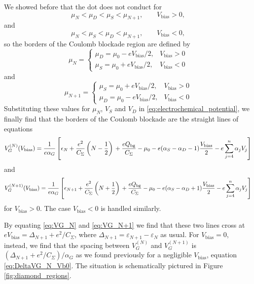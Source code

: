 We showed before that the dot does not conduct for
\begin{equation}
	 \mu_N < \mu_D < \mu_S < \mu_{N+1}, \qquad V_{\text{bias}} > 0,
\end{equation}
and
\begin{equation}
	 \mu_N < \mu_S < \mu_D < \mu_{N+1}, \qquad V_{\text{bias}} < 0,
\end{equation}
so the borders of the Coulomb blockade region are defined by
\begin{equation}
	\mu_N = 
	\begin{cases}
		\mu_D = \mu_0 - eV_{\text{bias}}/2, & V_{\text{bias}} > 0 \\
		\mu_S = \mu_0 + eV_{\text{bias}}/2, & V_{\text{bias}} < 0
	\end{cases}
\end{equation}
and
\begin{equation}
	\mu_{N+1} = 
	\begin{cases}
		\mu_S = \mu_0 + eV_{\text{bias}}/2, & V_{\text{bias}} > 0 \\
		\mu_D = \mu_0 - eV_{\text{bias}}/2, & V_{\text{bias}} < 0
	\end{cases}
\end{equation}
Substituting these values for $\mu_N$, $V_S$ and $V_D$ in \eqref{eq:electrochemical_potential}, we finally find that the borders of the Coulomb blockade are the straight lines of equations
\begin{dmath}
	V_G^{(N)}(V_{\text{bias}})
	= \frac{1}{e\alpha_G}\left[ \epsilon_N + \frac{e^2}{C_{\Sigma}}\left(N-\frac{1}{2}\right) \\
	+ \frac{eQ_{\text{bg}}}{C_{\Sigma}} - \mu_0 - e(\alpha_S-\alpha_D-1)\frac{V_{\text{bias}}}{2} - e\sum_{j=4}^{n}\alpha_jV_j \right]
	\label{eq:VG_N}
\end{dmath}
and
\begin{dmath}
	V_G^{(N+1)}(V_{\text{bias}})
	= \frac{1}{e\alpha_G}\left[ \epsilon_{N+1} + \frac{e^2}{C_{\Sigma}}\left(N+\frac{1}{2}\right) \\
	+ \frac{eQ_{\text{bg}}}{C_{\Sigma}} - \mu_0 - e(\alpha_S-\alpha_D+1)\frac{V_{\text{bias}}}{2} - e\sum_{j=4}^{n}\alpha_jV_j \right]
	\label{eq:VG_N+1}
\end{dmath}
for $V_{\text{bias}}>0$. The case $V_{\text{bias}}<0$ is handled similarly.

By equating \eqref{eq:VG_N} and \eqref{eq:VG_N+1} we find that these two lines cross at $eV_{\text{bias}} = \Delta_{N+1} + e^2/C_{\Sigma}$, where $\Delta_{N+1}=\varepsilon_{N+1}-\varepsilon_{N}$ as usual. For $V_{\text{bias}}=0$, instead, we find that the spacing between $V_G^{(N)}$ and $V_G^{(N+1)}$ is $(\Delta_{N+1} + e^2/C_{\Sigma})/\alpha_G$ as we found previously for a negligible $V_{\text{bias}}$, equation \eqref{eq:DeltaVG_N_Vb0}. The situation is schematically pictured in Figure \ref{fig:diamond_regions}.

